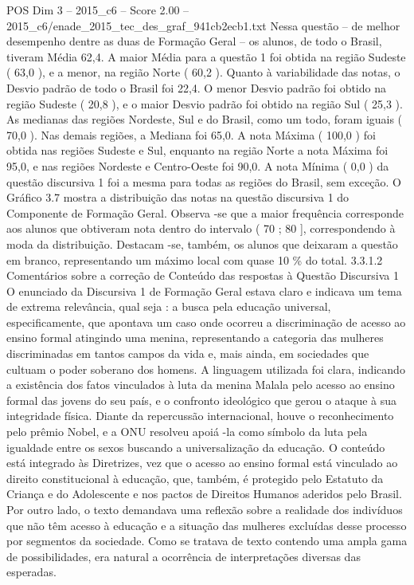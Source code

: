 \begin{textsample}{POS Dim 3 – 2015\_c6 – Score 2.00 – 2015\_c6/enade\_2015\_tec\_des\_graf\_941cb2ecb1.txt}
Nessa questão – de melhor desempenho dentre as duas de Formação Geral – os alunos, de todo o Brasil, tiveram Média 62,4.
A maior Média para a questão 1 foi obtida na região Sudeste ( 63,0 ), e a menor, na região Norte ( 60,2 ).
Quanto à variabilidade das notas, o Desvio padrão de todo o Brasil foi 22,4.
O menor Desvio padrão foi obtido na região Sudeste ( 20,8 ), e o maior Desvio padrão foi obtido na região Sul ( 25,3 ).
As medianas das regiões Nordeste, Sul e do Brasil, como um todo, foram iguais ( 70,0 ).
Nas demais regiões, a Mediana foi 65,0.
A nota Máxima ( 100,0 ) foi obtida nas regiões Sudeste e Sul, enquanto na região Norte a nota Máxima foi 95,0, e nas regiões Nordeste e Centro-Oeste foi 90,0.
A nota Mínima ( 0,0 ) da questão discursiva 1 foi a mesma para todas as regiões do Brasil, sem exceção.
O Gráfico 3.7 mostra a distribuição das notas na questão discursiva 1 do Componente de Formação Geral.
Observa -se que a maior frequência corresponde aos alunos que obtiveram nota dentro do intervalo ( 70 ; 80 ], correspondendo à moda da distribuição.
Destacam -se, também, os alunos que deixaram a questão em branco, representando um máximo local com quase 10 \% do total. 3.3.1.2 Comentários sobre a correção de Conteúdo das respostas à Questão Discursiva 1 O enunciado da Discursiva 1 de Formação Geral estava claro e indicava um tema de extrema relevância, qual seja : a busca pela educação universal, especificamente, que apontava um caso onde ocorreu a discriminação de acesso ao ensino formal atingindo uma menina, representando a categoria das mulheres discriminadas em tantos campos da vida e, mais ainda, em sociedades que cultuam o poder soberano dos homens.
A linguagem utilizada foi clara, indicando a existência dos fatos vinculados à luta da menina Malala pelo acesso ao ensino formal das jovens do seu país, e o confronto ideológico que gerou o ataque à sua integridade física.
Diante da repercussão internacional, houve o reconhecimento pelo prêmio Nobel, e a ONU resolveu apoiá -la como símbolo da luta pela igualdade entre os sexos buscando a universalização da educação.
O conteúdo está integrado às Diretrizes, vez que o acesso ao ensino formal está vinculado ao direito constitucional à educação, que, também, é protegido pelo Estatuto da Criança e do Adolescente e nos pactos de Direitos Humanos aderidos pelo Brasil.
Por outro lado, o texto demandava uma reflexão sobre a realidade dos indivíduos que não têm acesso à educação e a situação das mulheres excluídas desse processo por segmentos da sociedade.
Como se tratava de texto contendo uma ampla gama de possibilidades, era natural a ocorrência de interpretações diversas das esperadas.

\end{textsample}
